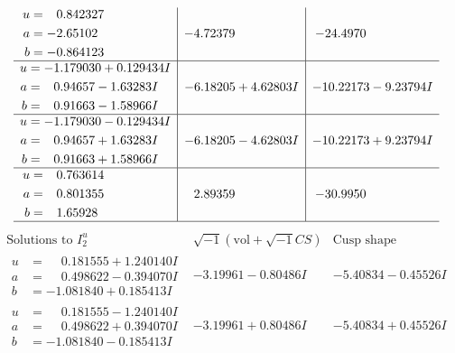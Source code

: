 \documentclass[1p]{elsarticle_modified}
\theoremstyle{definition}
\newcommand{\I}{\sqrt{-1}}
\begin{document}
$$\begin{array}{c|c|c}
\begin{aligned}
u &= \phantom{-}0.842327\phantom{ +0.000000I} \\
a &= -2.65102\phantom{ +0.000000I} \\
b &= -0.864123\phantom{ +0.000000I}\end{aligned}
 & -4.72379\phantom{ +0.000000I} & -24.4970\phantom{ +0.000000I} \\ \hline\begin{aligned}
u &= -1.179030 + 0.129434 I \\
a &= \phantom{-}0.94657 - 1.63283 I \\
b &= \phantom{-}0.91663 - 1.58966 I\end{aligned}
 & -6.18205 + 4.62803 I & -10.22173 - 9.23794 I \\ \hline\begin{aligned}
u &= -1.179030 - 0.129434 I \\
a &= \phantom{-}0.94657 + 1.63283 I \\
b &= \phantom{-}0.91663 + 1.58966 I\end{aligned}
 & -6.18205 - 4.62803 I & -10.22173 + 9.23794 I \\ \hline\begin{aligned}
u &= \phantom{-}0.763614\phantom{ +0.000000I} \\
a &= \phantom{-}0.801355\phantom{ +0.000000I} \\
b &= \phantom{-}1.65928\phantom{ +0.000000I}\end{aligned}
 & \phantom{-}2.89359\phantom{ +0.000000I} & -30.9950\phantom{ +0.000000I}\\
 \hline 
 \end{array}$$\newpage$$\begin{array}{c|c|c}  
\text{Solutions to }I^u_{2}& \I (\text{vol} + \sqrt{-1}CS) & \text{Cusp shape}\\
 \hline 
\begin{aligned}
u &= \phantom{-}0.181555 + 1.240140 I \\
a &= \phantom{-}0.498622 - 0.394070 I \\
b &= -1.081840 + 0.185413 I\end{aligned}
 & -3.19961 - 0.80486 I & -5.40834 - 0.45526 I \\ \hline\begin{aligned}
u &= \phantom{-}0.181555 - 1.240140 I \\
a &= \phantom{-}0.498622 + 0.394070 I \\
b &= -1.081840 - 0.185413 I\end{aligned}
 & -3.19961 + 0.80486 I & -5.40834 + 0.45526 I \\ \hline\begin{aligned}

\end{aligned}
\end{array}$$
\end{document}

